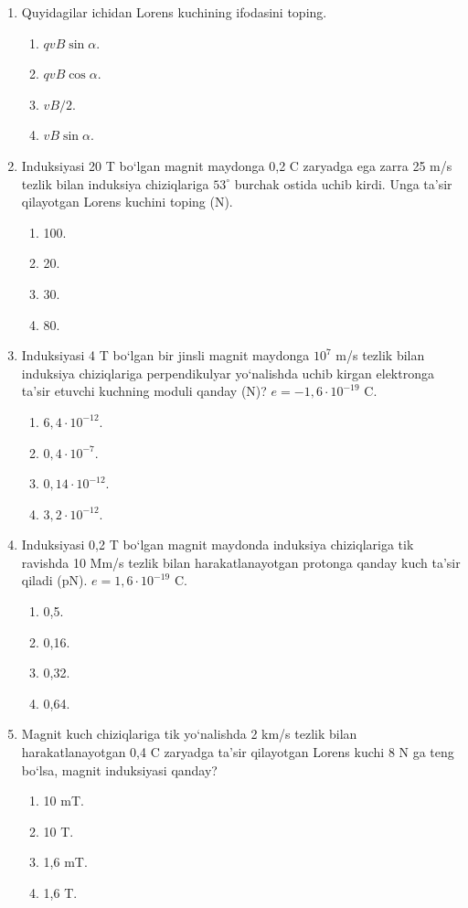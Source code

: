 \begin{enumerate}

\item Quyidagilar ichidan Lorens kuchining ifodasini toping.
\begin{enumerate}[label=\Alph*)]
\item $qvB\sin\alpha$.
\item $qvB\cos\alpha$.
\item $vB/2$.
\item $vB\sin\alpha$.
\end{enumerate}

\item Induksiyasi 20 T bo‘lgan magnit maydonga 0,2 C zaryadga ega zarra 25 m/s tezlik bilan induksiya chiziqlariga $53^\circ$ burchak ostida uchib kirdi. Unga ta’sir qilayotgan Lorens kuchini toping (N).
\begin{enumerate}[label=\Alph*)]
\item 100.
\item 20.
\item 30.
\item 80.
\end{enumerate}

\item Induksiyasi 4 T bo‘lgan bir jinsli magnit maydonga $10^7$ m/s tezlik bilan induksiya chiziqlariga perpendikulyar yo‘nalishda uchib kirgan elektronga ta’sir etuvchi kuchning moduli qanday (N)? $e = -1,6 \cdot 10^{-19}$ C.
\begin{enumerate}[label=\Alph*)]
\item $6,4 \cdot 10^{-12}$.
\item $0,4 \cdot 10^{-7}$.
\item $0,14 \cdot 10^{-12}$.
\item $3,2 \cdot 10^{-12}$.
\end{enumerate}

\item Induksiyasi 0,2 T bo‘lgan magnit maydonda induksiya chiziqlariga tik ravishda 10 Mm/s tezlik bilan harakatlanayotgan protonga qanday kuch ta’sir qiladi (pN). $e = 1,6 \cdot 10^{-19}$ C.
\begin{enumerate}[label=\Alph*)]
\item 0,5.
\item 0,16.
\item 0,32.
\item 0,64.
\end{enumerate}

\item Magnit kuch chiziqlariga tik yo‘nalishda 2 km/s tezlik bilan harakatlanayotgan 0,4 C zaryadga ta’sir qilayotgan Lorens kuchi 8 N ga teng bo‘lsa, magnit induksiyasi qanday?
\begin{enumerate}[label=\Alph*)]
\item 10 mT.
\item 10 T.
\item 1,6 mT.
\item 1,6 T.
\end{enumerate}


\end{enumerate}
